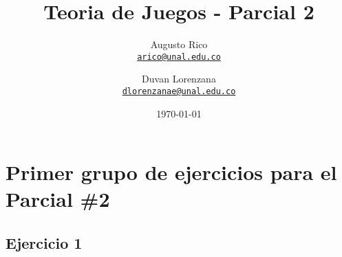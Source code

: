 \documentclass[11pt]{article}
\title{Teoria de Juegos - Parcial 2}
\author{Augusto Rico\\
    \href{mailto:arico@unal.edu.co}{\texttt{arico@unal.edu.co}}
    \and
    Duvan Lorenzana\\
    \href{mailto:dlorenzanae@unal.edu.co}{\texttt{dlorenzanae@unal.edu.co}}}
\date{\today}
\begin{document}
\maketitle



\section{Primer grupo de ejercicios para el Parcial \#2}

\subsection{Ejercicio 1}
\end{document}

